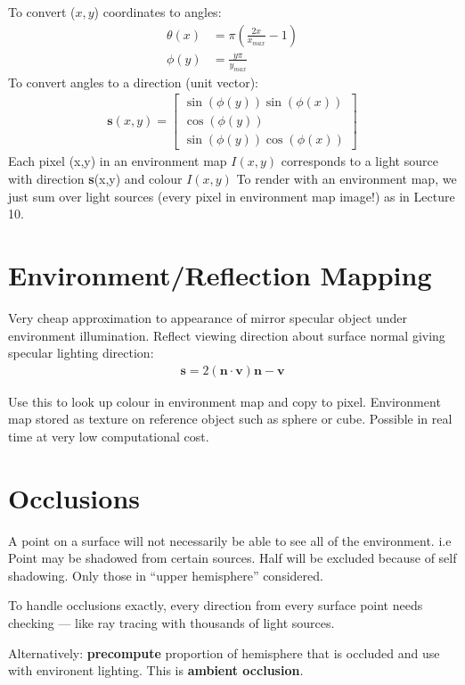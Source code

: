 \documentclass{article}
\begin{document}
To convert ($x,y$) coordinates to angles:
\begin{align*}
\theta(x) &= \pi\left ( \frac{2x}{x_{max}}-1\right ) \\
	\phi(y) &= \frac{y\pi}{y_{max}}
\end{align*}
To convert angles to a direction (unit vector):
\begin{align*}
	\textbf{s}(x,y) = 
	\begin{bmatrix}
		\sin(\phi(y))\sin(\phi(x)) \\
		\cos(\phi(y)) \\
		\sin(\phi(y)) \cos(\phi(x))
	\end{bmatrix}
\end{align*}
Each pixel (x,y) in an environment map $I(x,y)$ corresponds to a light source with direction \textbf{s}(x,y) and colour $I(x,y)$
To render with an environment map, we just sum over light sources (every pixel in environment map image!) as in Lecture 10.

\section{Environment/Reflection Mapping}
Very cheap approximation to appearance of mirror specular object under environment illumination.
Reflect viewing direction about surface normal giving specular lighting direction:
\begin{align*}
	\textbf{s} = 2(\textbf{n}\cdot \textbf{v})\textbf{n}-\textbf{v}
\end{align*}

Use this to look up colour in environment map and copy to pixel.
Environment map stored as texture on reference object such as sphere or cube.
Possible in real time at very low computational cost.

\section{Occlusions}
A point on a surface will not necessarily be able to see all of the environment.
i.e Point may be shadowed from certain sources.
Half will be excluded because of self shadowing.
Only those in ``upper hemisphere'' considered.

To handle occlusions exactly, every direction from every surface point needs checking --- like ray tracing with thousands of light sources.

Alternatively: \textbf{precompute} proportion of hemisphere that is occluded and use with environent lighting.
This is \textbf{ambient occlusion}.
\end{document}
